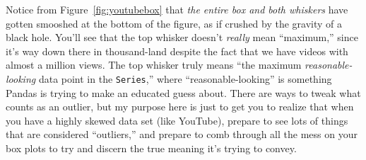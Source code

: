 Notice from Figure~\ref{fig:youtubebox} that \textit{the entire box and both
whiskers} have gotten smooshed at the bottom of the figure, as if crushed by
the gravity of a black hole. You'll see that the top whisker doesn't
\textit{really} mean ``maximum,'' since it's way down there in thousand-land
despite the fact that we have videos with almost a million views. The top
whisker truly means ``the maximum \textit{reasonable-looking} data point in the
\texttt{Series},'' where ``reasonable-looking'' is something Pandas is trying
to make an educated guess about. There are ways to tweak what counts as an
outlier, but my purpose here is just to get you to realize that when you have a
highly skewed data set (like YouTube), prepare to see lots of things that are
considered ``outliers,'' and prepare to comb through all the mess on your box
plots to try and discern the true meaning it's trying to convey.
